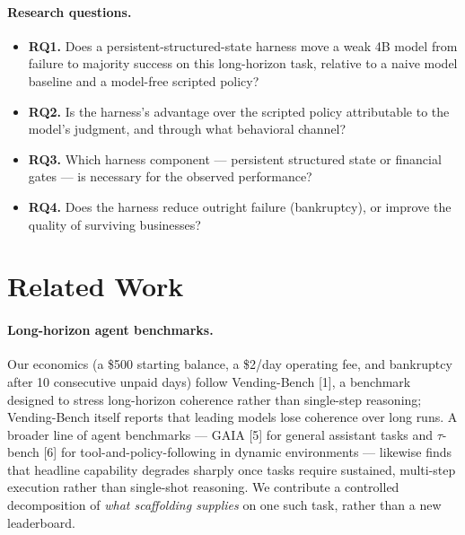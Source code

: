 \documentclass[11pt]{article}
\begin{document}
\paragraph{Research questions.}
\begin{itemize}
\item \textbf{RQ1.} Does a persistent-structured-state harness move a weak 4B
model from failure to majority success on this long-horizon task, relative to a
naive model baseline and a model-free scripted policy?
\item \textbf{RQ2.} Is the harness's advantage over the scripted policy
attributable to the model's judgment, and through what behavioral channel?
\item \textbf{RQ3.} Which harness component --- persistent structured state or
financial gates --- is necessary for the observed performance?
\item \textbf{RQ4.} Does the harness reduce outright failure (bankruptcy), or
improve the quality of surviving businesses?
\end{itemize}

\section{Related Work}

\paragraph{Long-horizon agent benchmarks.} Our economics (a \$500 starting
balance, a \$2/day operating fee, and bankruptcy after 10 consecutive unpaid
days) follow Vending-Bench [1], a benchmark designed to stress long-horizon
coherence rather than single-step reasoning; Vending-Bench itself reports that
leading models lose coherence over long runs. A broader line of agent
benchmarks --- GAIA [5] for general assistant tasks and $\tau$-bench [6] for
tool-and-policy-following in dynamic environments --- likewise finds that
headline capability degrades sharply once tasks require sustained, multi-step
execution rather than single-shot reasoning. We contribute a controlled
decomposition of \emph{what scaffolding supplies} on one such task, rather than
a new leaderboard.
\end{document}
